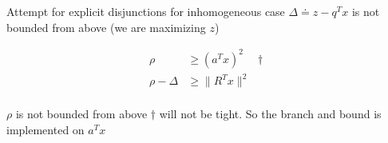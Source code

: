\documentclass[aspectratio=1610, 10pt]{beamer}
\begin{document}
\begin{frame}[allowframebreaks]{Attempt for explicit disjunctions for inhomogeneous case}
  \(\Delta \doteq z - q^Tx\) is not bounded from above (we are maximizing \(z\))


  \begin{align*}
    \rho            & \ge (a^Tx)^2 \quad \dagger \\
    \rho  -  \Delta & \ge \|R^Tx\|^2             \\
  \end{align*}

  \(\rho\) is not bounded from above \(\dagger\) will not be tight.
  So the branch and bound is implemented on \(a^Tx \)

\end{frame}


%   
%   
\end{document}
